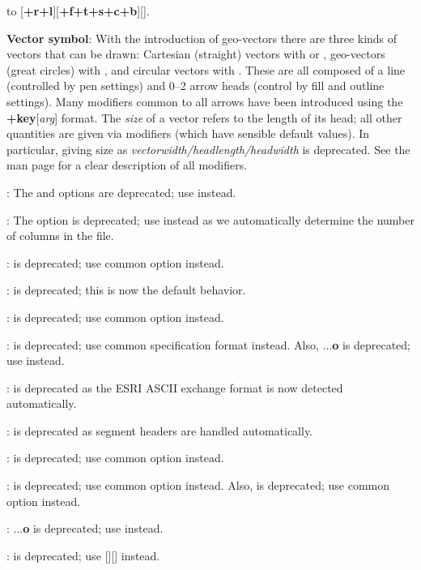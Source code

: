 \begin{enumerate}
{		to [{\bf +r+l}][{\bf +f+t+s+c+b}][].
	\item {\bf Vector symbol}: With the introduction of geo-vectors there are three kinds of vectors that can be drawn:
		Cartesian (straight) vectors with  or , geo-vectors (great circles) with , and circular vectors with .
		These are all composed of a line (controlled by pen settings) and 0--2 arrow heads (control by fill and outline settings).
		Many modifiers common to all arrows have been introduced using the {\bf +key}[{\it arg}] format.  The {\it size}
		of a vector refers to the length of its head; all other quantities are given via modifiers (which have sensible default values).
		In particular, giving size as {\it vectorwidth/headlength/headwidth} is deprecated.
		See the  man page for a clear description of all modifiers.
	\item {}: The  and  options are deprecated; use  instead.
	\item {}: The  option is deprecated; use  instead
		as we automatically determine the number of columns in the file.
	\item {}:  is deprecated; use common option  instead.
	\item {}:  is deprecated; this is now the default behavior.
	\item {}:  is deprecated; use common option  instead.
	\item {}:  is deprecated; use common specification format  instead. Also,
		...{\bf o} is deprecated; use  instead.
	\item {}:  is deprecated as the ESRI ASCII exchange format is now detected automatically.
	\item {}:  is deprecated as segment headers are handled automatically.
	\item {}:  is deprecated; use common option  instead.
	\item {}:  is deprecated; use common option  instead.  Also,
		 is deprecated; use common option  instead.
	\item {}: ...{\bf o} is deprecated; use  instead.
	\item {}:  is deprecated; use [][] instead.
}
\end{enumerate}
